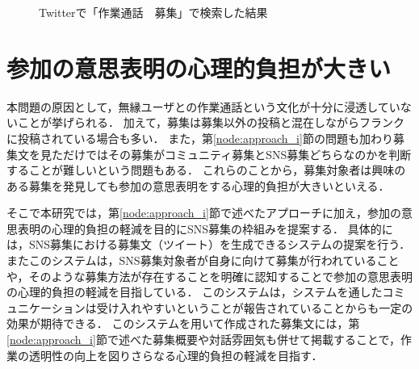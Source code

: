 \begin{figure}
    \centering
    \caption{Twitterで「作業通話　募集」で検索した結果}
    \label{fig:tweet_recruitment}
\end{figure}

\section{参加の意思表明の心理的負担が大きい}

本問題の原因として，無縁ユーザとの作業通話という文化が十分に浸透していないことが挙げられる．
加えて，募集は募集以外の投稿と混在しながらフランクに投稿されている場合も多い．
また，第\ref{node:approach_i}節の問題も加わり募集文を見ただけではその募集がコミュニティ募集とSNS募集どちらなのかを判断することが難しいという問題もある．
これらのことから，募集対象者は興味のある募集を発見しても参加の意思表明をする心理的負担が大きいといえる．

そこで本研究では，第\ref{node:approach_i}節で述べたアプローチに加え，参加の意思表明の心理的負担の軽減を目的にSNS募集の枠組みを提案する．
具体的には，SNS募集における募集文（ツイート）を生成できるシステムの提案を行う．
またこのシステムは，SNS募集対象者が自身に向けて募集が行われていることや，そのような募集方法が存在することを明確に認知することで参加の意思表明の心理的負担の軽減を目指している．
このシステムは，システムを通したコミュニケーションは受け入れやすいということが報告されていることからも一定の効果が期待できる\cite{Harada}\cite{Kimura}\cite{Nishimura}\cite{Tsuzuki}．
このシステムを用いて作成された募集文には，第\ref{node:approach_i}節で述べた募集概要や対話雰囲気も併せて掲載することで，作業の透明性の向上を図りさらなる心理的負担の軽減を目指す．
